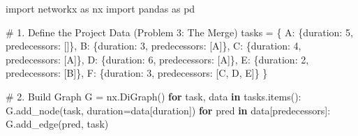 \documentclass[
  letterpaper,
  DIV=11,
  numbers=noendperiod]{scrreprt}
\newenvironment{Shaded}{\begin{snugshade}}{\end{snugshade}}
\newcommand{\CommentTok}[1]{\textcolor[rgb]{0.37,0.37,0.37}{#1}}
\newcommand{\ControlFlowTok}[1]{\textcolor[rgb]{0.00,0.23,0.31}{\textbf{#1}}}
\newcommand{\DecValTok}[1]{\textcolor[rgb]{0.68,0.00,0.00}{#1}}
\newcommand{\ImportTok}[1]{\textcolor[rgb]{0.00,0.46,0.62}{#1}}
\newcommand{\KeywordTok}[1]{\textcolor[rgb]{0.00,0.23,0.31}{\textbf{#1}}}
\newcommand{\NormalTok}[1]{\textcolor[rgb]{0.00,0.23,0.31}{#1}}
\newcommand{\OperatorTok}[1]{\textcolor[rgb]{0.37,0.37,0.37}{#1}}
\newcommand{\StringTok}[1]{\textcolor[rgb]{0.13,0.47,0.30}{#1}}
\begin{document}
\begin{Shaded}
\begin{Highlighting}[]
\ImportTok{import}\NormalTok{ networkx }\ImportTok{as}\NormalTok{ nx}
\ImportTok{import}\NormalTok{ pandas }\ImportTok{as}\NormalTok{ pd}

\CommentTok{\# 1. Define the Project Data (Problem 3: The Merge)}
\NormalTok{tasks }\OperatorTok{=}\NormalTok{ \{}
    \StringTok{\textquotesingle{}A\textquotesingle{}}\NormalTok{: \{}\StringTok{\textquotesingle{}duration\textquotesingle{}}\NormalTok{: }\DecValTok{5}\NormalTok{, }\StringTok{\textquotesingle{}predecessors\textquotesingle{}}\NormalTok{: []\},}
    \StringTok{\textquotesingle{}B\textquotesingle{}}\NormalTok{: \{}\StringTok{\textquotesingle{}duration\textquotesingle{}}\NormalTok{: }\DecValTok{3}\NormalTok{, }\StringTok{\textquotesingle{}predecessors\textquotesingle{}}\NormalTok{: [}\StringTok{\textquotesingle{}A\textquotesingle{}}\NormalTok{]\},}
    \StringTok{\textquotesingle{}C\textquotesingle{}}\NormalTok{: \{}\StringTok{\textquotesingle{}duration\textquotesingle{}}\NormalTok{: }\DecValTok{4}\NormalTok{, }\StringTok{\textquotesingle{}predecessors\textquotesingle{}}\NormalTok{: [}\StringTok{\textquotesingle{}A\textquotesingle{}}\NormalTok{]\},}
    \StringTok{\textquotesingle{}D\textquotesingle{}}\NormalTok{: \{}\StringTok{\textquotesingle{}duration\textquotesingle{}}\NormalTok{: }\DecValTok{6}\NormalTok{, }\StringTok{\textquotesingle{}predecessors\textquotesingle{}}\NormalTok{: [}\StringTok{\textquotesingle{}A\textquotesingle{}}\NormalTok{]\},}
    \StringTok{\textquotesingle{}E\textquotesingle{}}\NormalTok{: \{}\StringTok{\textquotesingle{}duration\textquotesingle{}}\NormalTok{: }\DecValTok{2}\NormalTok{, }\StringTok{\textquotesingle{}predecessors\textquotesingle{}}\NormalTok{: [}\StringTok{\textquotesingle{}B\textquotesingle{}}\NormalTok{]\},}
    \StringTok{\textquotesingle{}F\textquotesingle{}}\NormalTok{: \{}\StringTok{\textquotesingle{}duration\textquotesingle{}}\NormalTok{: }\DecValTok{3}\NormalTok{, }\StringTok{\textquotesingle{}predecessors\textquotesingle{}}\NormalTok{: [}\StringTok{\textquotesingle{}C\textquotesingle{}}\NormalTok{, }\StringTok{\textquotesingle{}D\textquotesingle{}}\NormalTok{, }\StringTok{\textquotesingle{}E\textquotesingle{}}\NormalTok{]\}}
\NormalTok{\}}

\CommentTok{\# 2. Build Graph}
\NormalTok{G }\OperatorTok{=}\NormalTok{ nx.DiGraph()}
\ControlFlowTok{for}\NormalTok{ task, data }\KeywordTok{in}\NormalTok{ tasks.items():}
\NormalTok{    G.add\_node(task, duration}\OperatorTok{=}\NormalTok{data[}\StringTok{\textquotesingle{}duration\textquotesingle{}}\NormalTok{])}
    \ControlFlowTok{for}\NormalTok{ pred }\KeywordTok{in}\NormalTok{ data[}\StringTok{\textquotesingle{}predecessors\textquotesingle{}}\NormalTok{]:}
\NormalTok{        G.add\_edge(pred, task)}


\end{Highlighting}
\end{Shaded}
\end{document}
